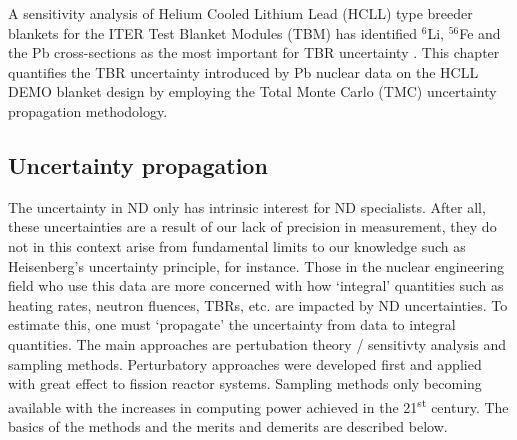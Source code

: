A sensitivity analysis of Helium Cooled Lithium Lead (HCLL)  type breeder blankets for the ITER Test Blanket Modules (TBM)  has identified $^{6}$Li, $^{56}$Fe and the Pb cross-sections as the most important for TBR uncertainty \cite{Leichtle2011}. This chapter quantifies the TBR uncertainty introduced by Pb nuclear data on the HCLL DEMO blanket design by employing the Total Monte Carlo (TMC) uncertainty propagation methodology.




\FloatBarrier
\subsection{Uncertainty propagation}
The uncertainty in ND only has intrinsic interest for ND specialists. After all, these uncertainties are a result of our lack of precision in measurement, they do not in this context arise from fundamental limits to our knowledge such as Heisenberg's uncertainty principle, for instance. Those in the nuclear engineering field who use this data are more concerned with how `integral' quantities such as heating rates, neutron fluences, TBRs, etc. are impacted by ND uncertainties. To estimate this, one must `propagate' the uncertainty from data to integral quantities. The main approaches are pertubation theory / sensitivty analysis and sampling methods. Perturbatory approaches were developed first and applied with great effect to fission reactor systems. Sampling methods only becoming available with the increases in computing power achieved in the 21\textsuperscript{st} century. The basics of the methods and the merits and demerits are described below.

